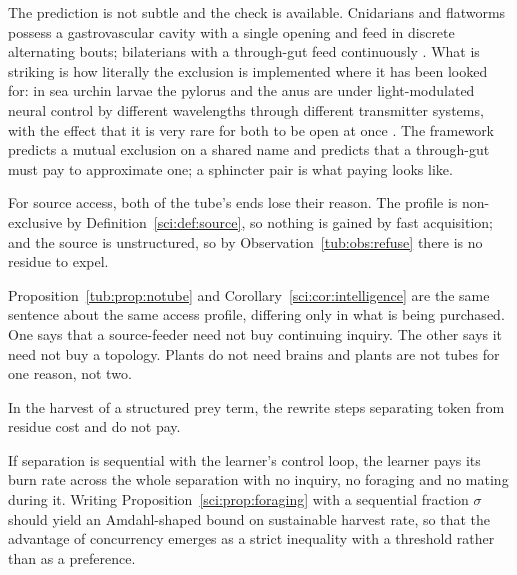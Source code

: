 The prediction is not subtle and the check is available. Cnidarians and flatworms
possess a gastrovascular cavity with a single opening and feed in discrete
alternating bouts; bilaterians with a through-gut feed continuously
\cite{stevenshume1995}. What is striking is how literally the exclusion is
implemented where it has been looked for: in sea urchin larvae the pylorus and
the anus are under light-modulated neural control by different wavelengths
through different transmitter systems, with the effect that it is very rare for
both to be open at once \cite{yaguchi2024}. The framework predicts a mutual
exclusion on a shared name and predicts that a through-gut must pay to
approximate one; a sphincter pair is what paying looks like.

\begin{proposition}
\label{tub:prop:notube}
For source access, both of the tube's ends lose their reason. The profile is
non-exclusive by Definition~\ref{sci:def:source}, so nothing is gained by fast
acquisition; and the source is unstructured, so by
Observation~\ref{tub:obs:refuse} there is no residue to expel.
\end{proposition}

Proposition~\ref{tub:prop:notube} and Corollary~\ref{sci:cor:intelligence} are
the same sentence about the same access profile, differing only in what is being
purchased. One says that a source-feeder need not buy continuing inquiry. The
other says it need not buy a topology. Plants do not need brains and plants are
not tubes for one reason, not two.

\begin{conjecture}
\label{tub:conj:sep}
In the harvest of a structured prey term, the rewrite steps separating token
from residue cost and do not pay.
\end{conjecture}

\begin{conjecture}
\label{tub:conj:serial}
If separation is sequential with the learner's control loop, the learner pays
its burn rate across the whole separation with no inquiry, no foraging and no
mating during it. Writing Proposition~\ref{sci:prop:foraging} with a sequential
fraction $\sigma$ should yield an Amdahl-shaped bound \cite{amdahl1967} on
sustainable harvest rate, so that the advantage of concurrency emerges as a
strict inequality with a threshold rather than as a preference.
\end{conjecture}

